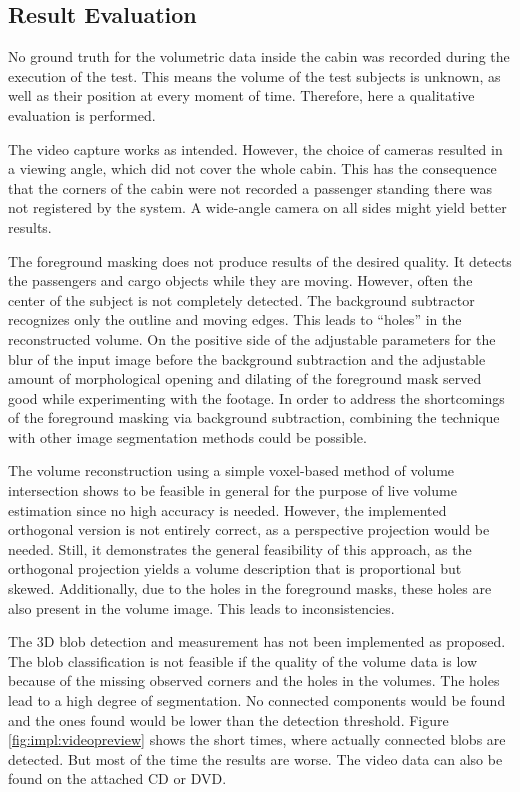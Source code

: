 \newpage

\subsection{Result Evaluation}
No ground truth for the volumetric data inside the cabin was recorded during the execution of the test.
This means the volume of the test subjects is unknown, as well as their position at every moment of time.
Therefore, here a qualitative evaluation is performed. 

The video capture works as intended.
However, the choice of cameras resulted in a viewing angle, which did not cover the whole cabin.
This has the consequence that the corners of the cabin were not recorded a passenger standing there was not registered by the system.
A wide-angle camera on all sides might yield better results.

The foreground masking does not produce results of the desired quality.
It detects the passengers and cargo objects while they are moving.
However, often the center of the subject is not completely detected.
The background subtractor recognizes only the outline and moving edges.
This leads to \enquote{holes} in the reconstructed volume.
On the positive side of the adjustable parameters for the blur of the input image before the background subtraction and the adjustable amount of morphological opening and dilating of the foreground mask served good while experimenting with the footage.
In order to address the shortcomings of the foreground masking via background subtraction,
combining the technique with other image segmentation methods could be possible.

The volume reconstruction using a simple voxel-based method of volume intersection shows to be feasible in general for the purpose of live volume estimation since no high accuracy is needed.
However, the implemented orthogonal version is not entirely correct, as a perspective projection would be needed.
Still, it demonstrates the general feasibility of this approach, 
as the orthogonal projection yields a volume description that is proportional but skewed.
Additionally, due to the holes in the foreground masks, these holes are also present in the volume image. 
This leads to inconsistencies.

The \ac{3D} blob detection and measurement has not been implemented as proposed.
The blob classification is not feasible if the quality of the volume data is low because of the missing observed corners and the holes in the volumes.
The holes lead to a high degree of segmentation. No connected components would be found and the ones found would be lower than the detection threshold.
Figure \ref{fig:impl:videopreview} shows the short times, where actually connected blobs are detected. But most of the time the results are worse.
The video data can also be found on the attached CD or DVD.


